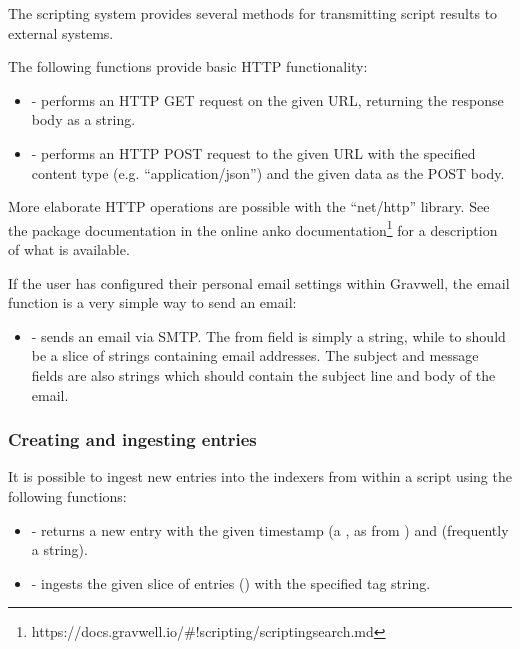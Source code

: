 The scripting system provides several methods for transmitting script
results to external systems.

The following functions provide basic HTTP functionality:

\begin{itemize}
\tightlist
\item
   - performs an HTTP GET request on the
  given URL, returning the response body as a string.
\item
   - performs an
  HTTP POST request to the given URL with the specified content type
  (e.g. ``application/json'') and the given data as the POST body.
\end{itemize}

More elaborate HTTP operations are possible with the ``net/http''
library. See the package documentation in
the online anko
documentation\footnote{https://docs.gravwell.io/\#!scripting/scriptingsearch.md} for a description of what is available.

If the user has configured their personal email settings within
Gravwell, the email function is a very simple way to send an email:

\begin{itemize}
\tightlist
\item
   - sends an email via SMTP.
  The from field is simply a string, while to should be a slice of
  strings containing email addresses. The subject and message fields are
  also strings which should contain the subject line and body of the
  email.
\end{itemize}

\subsubsection{Creating and ingesting entries}

It is possible to ingest new entries into the indexers from within a
script using the following functions:

\begin{itemize}
\tightlist
\item
   - returns a new entry with the
  given timestamp (a , as from ) and
   (frequently a string).
\item
   - ingests the given slice of
  entries () with the specified tag string.
\end{itemize}

